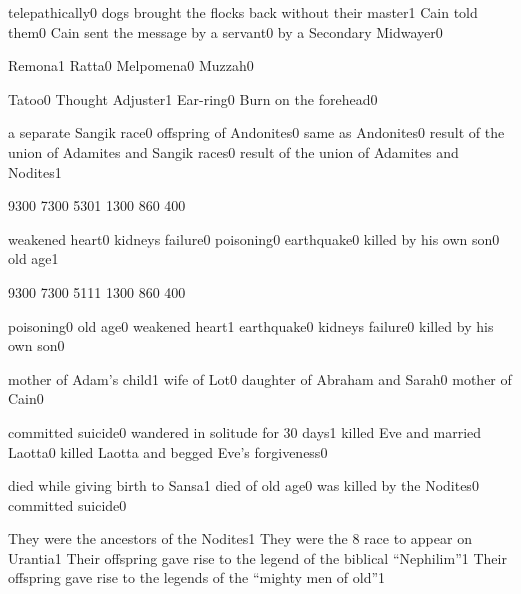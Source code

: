 {telepathically}{0}
{dogs brought the flocks back without their master}{1}
{Cain told them}{0}
{Cain sent the message by a servant}{0}
{by a Secondary Midwayer}{0}
\qstop

{Remona}{1}
{Ratta}{0}
{Melpomena}{0}
{Muzzah}{0}
\qstop

{Tatoo}{0}
{Thought Adjuster}{1}
{Ear-ring}{0}
{Burn on the forehead}{0}
\qstop

{a separate Sangik race}{0}
{offspring of Andonites}{0}
{same as Andonites}{0}
{result of the union of Adamites and Sangik races}{0}
{result of the union of Adamites and Nodites}{1}
\qstop

{930}{0}
{730}{0}
{530}{1}
{130}{0}
{86}{0}
{40}{0}
\qstop

{weakened heart}{0}
{kidneys failure}{0}
{poisoning}{0}
{earthquake}{0}
{killed by his own son}{0}
{old age}{1}
\qstop

{930}{0}
{730}{0}
{511}{1}
{130}{0}
{86}{0}
{40}{0}
\qstop

{poisoning}{0}
{old age}{0}
{weakened heart}{1}
{earthquake}{0}
{kidneys failure}{0}
{killed by his own son}{0}
\qstop

{mother of Adam's child}{1}
{wife of Lot}{0}
{daughter of Abraham and Sarah}{0}
{mother of Cain}{0}
\qstop

{committed suicide}{0}
{wandered in solitude for 30 days}{1}
{killed Eve and married Laotta}{0}
{killed Laotta and begged Eve's forgiveness}{0}
\qstop


{died while giving birth to Sansa}{1}
{died of old age}{0}
{was killed by the Nodites}{0}
{committed suicide}{0}
\qstop


{They were the ancestors of the Nodites}{1}
{They were the 8 race to appear on Urantia}{1}
{Their offspring gave rise to the legend of the biblical ``Nephilim''}{1}
{Their offspring gave rise to the legends of the ``mighty men of old''}{1}
\qstop

